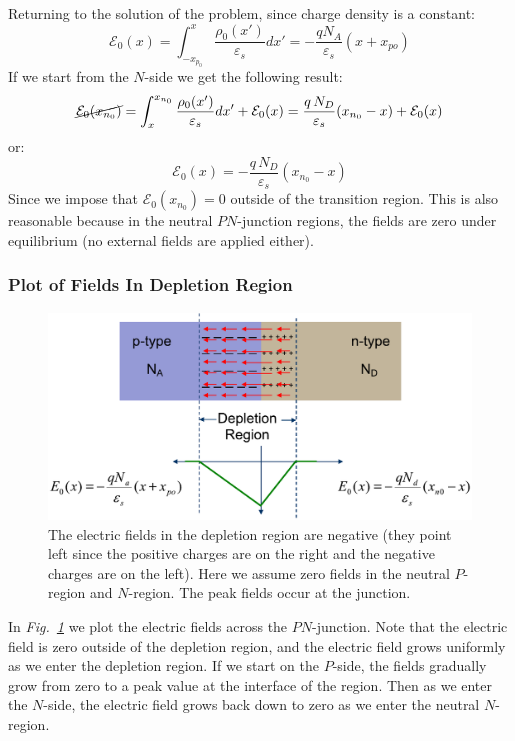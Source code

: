Returning to the solution of the problem, since charge density is a constant:
    \begin{equation} 
        \mathcal{E}_0(x) = \int_{-x_{p_0}}^x {\frac{\rho_0(x')}{\varepsilon_s}dx'} = -\frac{q{N_A}}{\varepsilon_s}(x + x_{po}) 
    \end{equation}
If we start from the $N$-side we get the following result:
    \begin{equation} 
        \cancel{\mathcal{E}_0(x_{n_0})} = \int_x^{x_{n_0}} {\frac{{\rho_0}(x')}{\varepsilon_s}dx'} + \mathcal{E}_0(x) =  \frac{q\,N_D}{\varepsilon_s}(x_{n_0} - x) + \mathcal{E}_0(x) 
    \end{equation}
or:
    \begin{equation} 
        \mathcal{E}_0(x) = -\frac{q\,N_D}{\varepsilon_s}(x_{n_0} - x)
    \end{equation}
Since we impose that $\mathcal{E}_0(x_{n_0}) = 0$ outside of the transition region.  This is also reasonable because in the neutral $PN$-junction regions, the fields are zero under equilibrium (no external fields are applied either).  
\subsubsection{Plot of Fields In Depletion Region}
\begin{figure}[H]
\centering
\includegraphics[width=\columnwidth]{slide18}
\caption{The electric fields in the depletion region are negative (they point left since the positive charges are on the right and the negative charges are on the left).  Here we assume zero fields in the neutral $P$-region and $N$-region.  The peak fields occur at the junction.}
\label{fig:slide18}
\end{figure}
In \emph{Fig.~\ref{fig:slide18}} we plot the electric fields across the $PN$-junction.  Note that the electric field is zero outside of the depletion region, and the electric field grows uniformly as we enter the depletion region.  If we start on the $P$-side, the fields gradually grow from zero to a peak value at the interface of the region.  Then as we enter the $N$-side, the electric field grows back down to zero as we enter the neutral $N$-region.  

